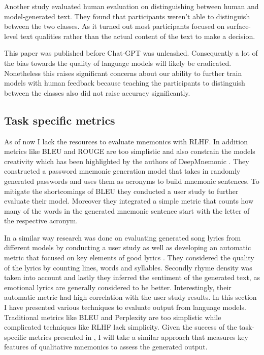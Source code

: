 Another study \cite{clark2020human} evaluated human evaluation on distinguishing between human and model-generated text. They found that participants weren't able to distinguish between the two classes. As it turned out most participants focused on surface-level text qualities rather than the actual content of the text to make a decision.

This paper was published before Chat-GPT was unleashed. Consequently a lot of the bias towards the quality of language models will likely be eradicated. Nonetheless this raises significant concerns about our ability to further train models with human feedback because teaching the participants to distinguish between the classes also did not raise accuracy significantly.

\subsection{Task specific metrics}
As of now I lack the resources to evaluate mnemonics with RLHF. In addition metrics like BLEU and ROUGE are too simplistic and also constrain the models creativity which has been highlighted by the authors of DeepMnemonic \cite{deepMnemonic2022}. They constructed a password mnemonic generation model that takes in randomly generated passwords and uses them as acronyms to build mnemonic sentences. To mitigate the shortcomings of BLEU they conducted a user study to further evaluate their model. Moreover they integrated a simple metric that counts how many of the words in the generated mnemonic sentence start with the letter of the respective acronym. 

In a similar way research was done on evaluating generated song lyrics from different models by conducting a user study as well as developing an automatic metric that focused on key elements of good lyrics \cite{lyrics_gen_2021}. They considered the quality of the lyrics by counting lines, words and syllables. Secondly rhyme density was taken into account and lastly they inferred the sentiment of the generated text, as emotional lyrics are generally considered to be better. Interestingly, their automatic metric had high correlation with the user study results. 
\newline
\newline
In this section I have presented various techniques to evaluate output from language models. Traditional metrics like BLEU and Perplexity are too simplistic while complicated techniques like RLHF lack simplicity. Given the success of the task-specific metrics presented in \cite{lyrics_gen_2021}, I will take a similar approach that measures key features of qualitative mnemonics to assess the generated output.

